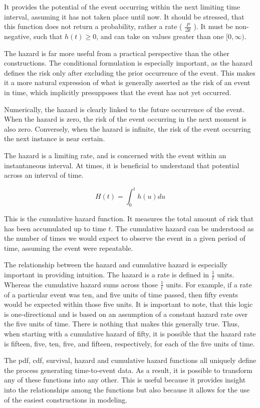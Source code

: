 It provides the potential of the event occurring within the next limiting time interval, assuming it has not taken place until now. It should be stressed, that this function does not return a probability, rather a rate ( $\frac{P}{\Delta t}$ ). It must be non-negative, such that $h(t) \ge 0$, and can take on values greater than one $[0, \infty)$.

The hazard is far more useful from a practical perspective than the other constructions. The conditional formulation is especially important, as the hazard defines the risk only after excluding the prior occurrence of the event. This makes it a more natural expression of what is generally asserted as the risk of an event in time, which implicitly presupposes that the event has not yet occurred.

Numerically, the hazard is clearly linked to the future occurrence of the event. When the hazard is zero, the risk of the event occurring in the next moment is also zero. Conversely, when the hazard is infinite, the risk of the event occurring the next instance is near certain.

The hazard is a limiting rate, and is concerned with the event within an instantaneous interval. At times, it is beneficial to understand that potential across an interval of time.

$$ H(t) = \int^t_0 h(u) du $$

This is the cumulative hazard function. It measures the total amount of risk that has been accumulated up to time $t$. The cumulative hazard can be understood as the number of times we would expect to observe the event in a given period of time, assuming the event were repeatable.

The relationship between the hazard and cumulative hazard is especially important in providing intuition. The hazard is a rate is defined in $\frac{1}{t}$ units. Whereas the cumulative hazard sums across those $\frac{1}{t}$ units. For example, if a rate of a particular event was ten, and five units of time passed, then fifty events would be expected within those five units. It is important to note, that this logic is one-directional and is based on an assumption of a constant hazard rate over the five units of time. There is nothing that makes this generally true. Thus, when starting with a cumulative hazard of fifty, it is possible that the hazard rate is fifteen, five, ten, five, and fifteen, respectively, for each of the five units of time. 

The pdf, cdf, survival, hazard and cumulative hazard functions all uniquely define the process generating time-to-event data. As a result, it is possible to transform any of these functions into any other. This is useful because it provides insight into the relationships among the functions but also because it allows for the use of the easiest constructions in modeling.

